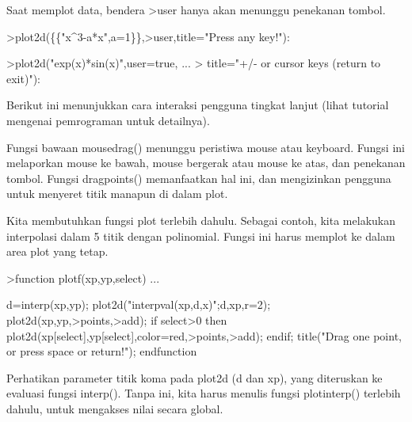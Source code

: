 \documentclass[12pt,Times new roman,letterpaper]{book}
\begin{document}
\begin{eulernootebook}
\begin{eulercomment}
\begin{eulercomment}
\begin{eulernootebook}
\begin{eulercomment}
\begin{eulercomment}
\begin{eulercomment}
\begin{eulercomment}
\begin{eulercomment}
\begin{eulercomment}
\begin{eulercomment}
\begin{eulernotebook}
\begin{eulercomment}
\begin{eulercomment}
\begin{eulercomment}
\begin{eulercomment}
\begin{eulercomment}
Saat memplot data, bendera \textgreater{}user hanya akan menunggu penekanan tombol.
\end{eulercomment}
\begin{eulerprompt}
>plot2d(\{\{"x^3-a*x",a=1\}\},>user,title="Press any key!"):
\end{eulerprompt}
\begin{eulerprompt}
>plot2d("exp(x)*sin(x)",user=true, ...
>  title="+/- or cursor keys (return to exit)"):
\end{eulerprompt}
\begin{eulercomment}
Berikut ini menunjukkan cara interaksi pengguna tingkat lanjut (lihat
tutorial mengenai pemrograman untuk detailnya).

Fungsi bawaan mousedrag() menunggu peristiwa mouse atau keyboard.
Fungsi ini melaporkan mouse ke bawah, mouse bergerak atau mouse ke
atas, dan penekanan tombol. Fungsi dragpoints() memanfaatkan hal ini,
dan mengizinkan pengguna untuk menyeret titik manapun di dalam plot.

Kita membutuhkan fungsi plot terlebih dahulu. Sebagai contoh, kita
melakukan interpolasi dalam 5 titik dengan polinomial. Fungsi ini
harus memplot ke dalam area plot yang tetap.
\end{eulercomment}
\begin{eulerprompt}
>function plotf(xp,yp,select) ...
\end{eulerprompt}
\begin{eulerudf}
    d=interp(xp,yp);
    plot2d("interpval(xp,d,x)";d,xp,r=2);
    plot2d(xp,yp,>points,>add);
    if select>0 then
      plot2d(xp[select],yp[select],color=red,>points,>add);
    endif;
    title("Drag one point, or press space or return!");
  endfunction
\end{eulerudf}
\begin{eulercomment}
Perhatikan parameter titik koma pada plot2d (d dan xp), yang
diteruskan ke evaluasi fungsi interp(). Tanpa ini, kita harus menulis
fungsi plotinterp() terlebih dahulu, untuk mengakses nilai secara
global.


\end{eulercomment}
\end{eulercomment}
\end{eulercomment}
\end{eulercomment}
\end{eulercomment}
\end{eulernotebook}
\end{eulercomment}
\end{eulercomment}
\end{eulercomment}
\end{eulercomment}
\end{eulercomment}
\end{eulercomment}
\end{eulercomment}
\end{eulernootebook}
\end{eulercomment}
\end{eulercomment}
\end{eulernootebook}
\end{document}
